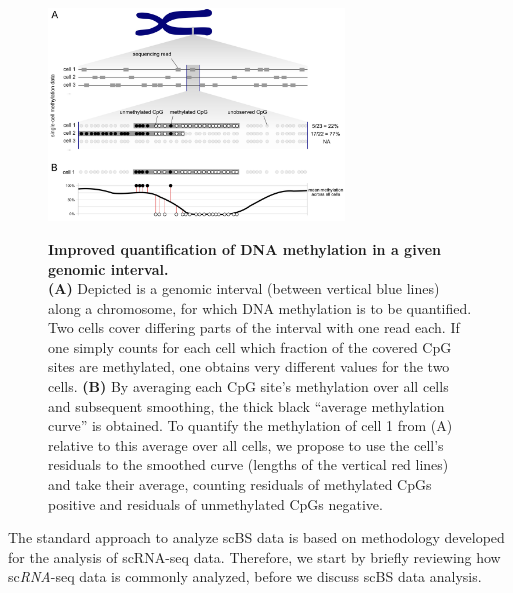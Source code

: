 \documentclass[twocolumn,10pt]{article}
\begin{document}
\begin{figure}[t]
    \begin{center}
        \includegraphics[width=0.7\textwidth]{figures/Fig_residuals_AB.png}\\
    \end{center}
    \caption{\small \textbf{Improved quantification of DNA methylation in a given genomic interval.}\\
    \textbf{(A)} Depicted is a genomic interval (between vertical blue lines) along a chromosome, for which DNA methylation is to be quantified.
    Two cells cover differing parts of the interval with one read each.
    If one simply counts for each cell which fraction of the covered CpG sites are methylated, one obtains very different values for the two cells.
    \textbf{(B)} By averaging each CpG site's methylation over all cells and subsequent smoothing, the thick black ``average methylation curve'' is obtained.
    To quantify the methylation of cell 1 from (A) relative to this average over all cells, we propose to use the cell's residuals to the smoothed curve (lengths of the vertical red lines) and take their average, counting residuals of methylated CpGs positive and residuals of unmethylated CpGs negative.}
    \label{fig:smoothres}
\end{figure}


The standard approach to analyze scBS data is based on methodology developed for the analysis of scRNA-seq data.
Therefore, we start by briefly reviewing how sc\emph{RNA}-seq data is commonly analyzed, before we discuss scBS data analysis.
\end{document}
